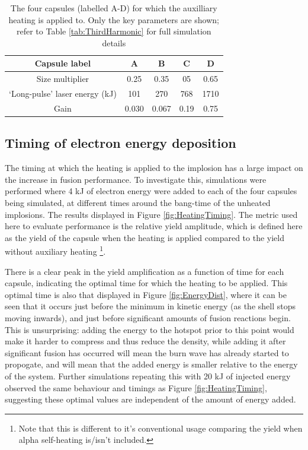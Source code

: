 \begin{table}
\centering
\begin{tabular}{|c|c|c|c|c|}
\hline
Capsule label &  A & B & C & D \\ 
\hline
Size multiplier & 0.25 & 0.35 & 05 & 0.65 \\
`Long-pulse' laser energy (kJ) & 101  & 270 & 768 & 1710 \\ 
Gain & 0.030 & 0.067 & 0.19 & 0.75\\ 
\hline
  \end{tabular}
  \caption{The four capsules (labelled A-D) for which the auxilliary heating is applied to. Only the key parameters are shown; refer to Table \ref{tab:ThirdHarmonic} for full simulation details}
  \label{tab:Heating capsules}
\end{table}

\subsection{Timing of electron energy deposition}

The timing at which the heating is applied to the implosion has a large impact on the increase in fusion performance. To investigate this, simulations were performed where 4 kJ of electron energy were added to each of the four capsules being simulated, at different times around the bang-time of the unheated implosions. The results displayed in Figure \ref{fig:HeatingTiming}. The metric used here to evaluate performance is the relative yield amplitude, which is defined here as the yield of the capsule when the heating is applied compared to the yield without auxiliary heating \footnote{Note that this is different to it's conventional usage comparing the yield when alpha self-heating is/isn't included.}.

There is a clear peak in the yield amplification as a function of time for each capsule, indicating the optimal time for which the heating to be applied. This optimal time is also that displayed in Figure \ref{fig:EnergyDist}, where it can be seen that it occurs just before the minimum in kinetic energy (as the shell stops moving inwards), and just before significant amounts of fusion reactions begin. This is unsurprising: adding the energy to the hotspot prior to this point would make it harder to compress and thus reduce the density, while adding it after significant fusion has occurred will mean the burn wave has already started to propogate, and will mean that the added energy is smaller relative to the energy of the system. Further simulations repeating this with 20 kJ of injected energy observed the same behaviour and timings as Figure \ref{fig:HeatingTiming}, suggesting these optimal values are independent of the amount of energy added.

